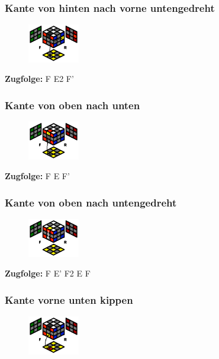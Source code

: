 \documentclass[letterpaper,10pt,twoside,twocolumn,openany]{book}
\begin{document}
\subsubsection{Kante von hinten nach vorne unten\newline gedreht}
\begin{figure}[!htb] 
  \centering
     \includegraphics[width=0.20\textwidth]{img/hinten-rechts-vorne-unten-2.png}
\end{figure}
\centering \textbf{Zugfolge:} F E2 F'

\subsubsection{Kante von oben nach unten}
\begin{figure}[!htb] 
  \centering
     \includegraphics[width=0.20\textwidth]{img/oben-nach-unten.png}
\end{figure}
\centering \textbf{Zugfolge:} F E F'

\subsubsection{Kante von oben nach unten\newline gedreht}
\begin{figure}[!htb] 
  \centering
     \includegraphics[width=0.20\textwidth]{img/oben-nach-unten2.png}
\end{figure}
\centering \textbf{Zugfolge:} F E' F2 E F

\newpage
\subsubsection{Kante vorne unten kippen}
\begin{figure}[!htb] 
  \centering
     \includegraphics[width=0.20\textwidth]{img/oben-unten-nach-unten-twist.png}
\end{figure}
\end{document}
